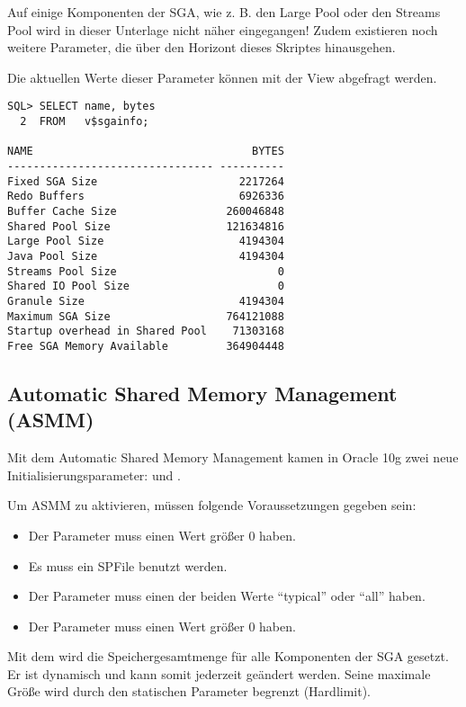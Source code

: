         \begin{merke}
          Auf einige Komponenten der SGA, wie z. B. den Large Pool oder den Streams Pool wird in dieser Unterlage nicht näher eingegangen! Zudem existieren noch weitere Parameter, die über den Horizont dieses Skriptes hinausgehen.
        \end{merke}
        Die aktuellen Werte dieser Parameter können mit der View  abgefragt werden.
        \begin{lstlisting}[caption={Größe der SGA-Komponenten ermitteln},label=admin22,language=oracle_sql]
SQL> SELECT name, bytes
  2  FROM   v$sgainfo;

NAME                                  BYTES
-------------------------------- ----------
Fixed SGA Size                      2217264
Redo Buffers                        6926336
Buffer Cache Size                 260046848
Shared Pool Size                  121634816
Large Pool Size                     4194304
Java Pool Size                      4194304
Streams Pool Size                         0
Shared IO Pool Size                       0
Granule Size                        4194304
Maximum SGA Size                  764121088
Startup overhead in Shared Pool    71303168
Free SGA Memory Available         364904448
        \end{lstlisting}
      \subsection{Automatic Shared Memory Management (ASMM)}
        Mit dem Automatic Shared Memory Management kamen in Oracle 10g zwei neue Initialisierungsparameter:  und .

        Um ASMM zu aktivieren, müssen folgende Voraussetzungen gegeben sein:
        \begin{itemize}
          \item Der Parameter  muss einen Wert größer 0 haben.
          \item Es muss ein SPFile benutzt werden.
          \item Der Parameter  muss einen der beiden Werte \enquote{typical} oder \enquote{all} haben.
          \item Der Parameter  muss einen Wert größer 0 haben.
        \end{itemize}
        Mit dem  wird die Speichergesamtmenge für alle Komponenten der SGA gesetzt. Er ist dynamisch und kann somit jederzeit geändert werden. Seine maximale Größe wird durch den statischen Parameter  begrenzt (Hardlimit).

